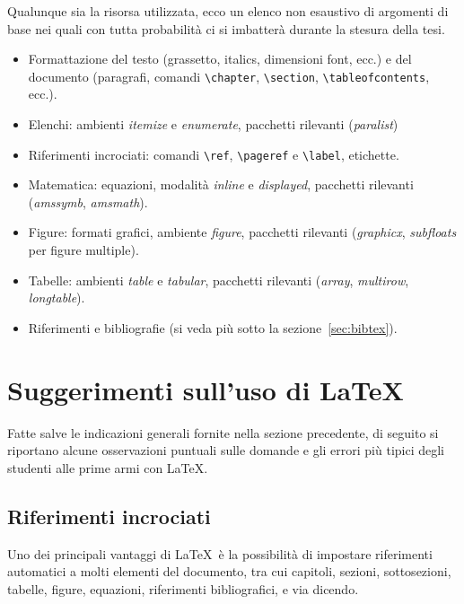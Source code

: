 \documentclass[12pt]{report}
\begin{document}
Qualunque sia la risorsa utilizzata, ecco un elenco non esaustivo di argomenti di base nei quali con tutta probabilit\`a ci si imbatter\`a durante la stesura della tesi.
\begin{itemize}
\item Formattazione del testo (grassetto, italics, dimensioni font, ecc.) e del documento (paragrafi, comandi \verb|\chapter|, \verb|\section|, \verb|\tableofcontents|, ecc.).
\item Elenchi: ambienti {\em itemize} e {\em enumerate}, pacchetti rilevanti ({\em paralist})
\item Riferimenti incrociati: comandi \verb|\ref|, \verb|\pageref| e \verb|\label|, etichette.
\item Matematica: equazioni, modalit\`a {\em inline} e {\em displayed}, pacchetti rilevanti ({\em amssymb}, {\em amsmath}).
\item Figure: formati grafici, ambiente {\em figure}, pacchetti rilevanti ({\em graphicx}, {\em subfloats} per figure multiple).
\item Tabelle: ambienti {\em table} e {\em tabular}, pacchetti rilevanti ({\em array}, {\em multirow}, {\em longtable}).
\item Riferimenti e bibliografie (si veda pi\`u sotto la sezione~\ref{sec:bibtex}).
\end{itemize}

\section{Suggerimenti sull'uso di \LaTeX}
\label{sec:consigli_latex}

Fatte salve le indicazioni generali fornite nella sezione precedente, di seguito si riportano alcune osservazioni puntuali sulle domande e gli errori pi\`u tipici degli studenti alle prime armi con \LaTeX.

\subsection{Riferimenti incrociati}

Uno dei principali vantaggi di \LaTeX\ è la possibilità di impostare riferimenti automatici a molti elementi del documento, tra cui capitoli, sezioni, sottosezioni, tabelle, figure, equazioni, riferimenti bibliografici, e via dicendo.
\end{document}
